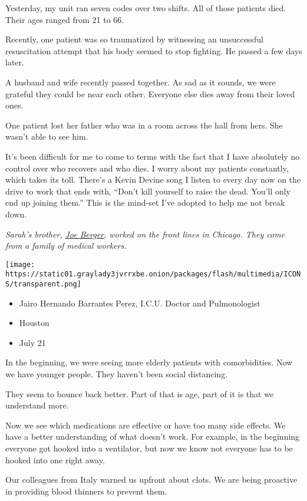 Yesterday, my unit ran seven codes over two shifts. All of those
patients died. Their ages ranged from 21 to 66.

Recently, one patient was so traumatized by witnessing an unsuccessful
resuscitation attempt that his body seemed to stop fighting. He passed a
few days later.

A husband and wife recently passed together. As sad as it sounds, we
were grateful they could be near each other. Everyone else dies away
from their loved ones.

One patient lost her father who was in a room across the hall from hers.
She wasn't able to see him.

It's been difficult for me to come to terms with the fact that I have
absolutely no control over who recovers and who dies. I worry about my
patients constantly, which takes its toll. There's a Kevin Devine song I
listen to every day now on the drive to work that ends with, ``Don't
kill yourself to raise the dead. You'll only end up joining them.'' This
is the mind-set I've adopted to help me not break down.

\emph{Sarah's brother,}
\emph{\href{https://www.nytimes3xbfgragh.onion/interactive/2020/world/coronavirus-health-care-workers.html\#item-joe-berger}{Joe
Berger}, worked on the front lines in Chicago. They come from a family
of medical workers.}

\texttt{[image: https://static01.graylady3jvrrxbe.onion/packages/flash/multimedia/ICONS/transparent.png]}

\begin{itemize}
\tightlist
\item
  Jairo Hernando Barrantes Perez, I.C.U. Doctor and Pulmonologist
\item
  Houston
\item
  July 21
\end{itemize}

In the beginning, we were seeing more elderly patients with
comorbidities. Now we have younger people. They haven't been social
distancing.

They seem to bounce back better. Part of that is age, part of it is that
we understand more.

Now we see which medications are effective or have too many side
effects. We have a better understanding of what doesn't work. For
example, in the beginning everyone got hooked into a ventilator, but now
we know not everyone has to be hooked into one right away.

Our colleagues from Italy warned us upfront about clots. We are being
proactive in providing blood thinners to prevent them.

